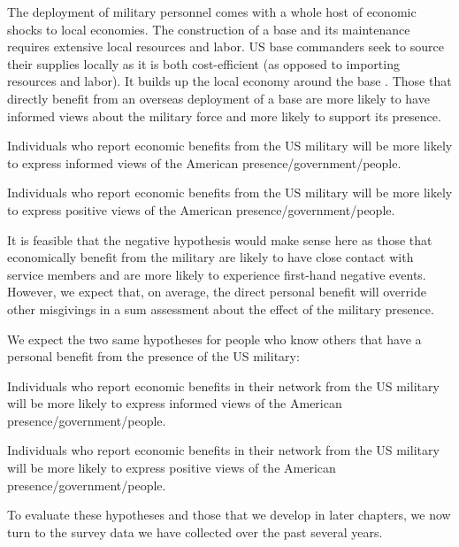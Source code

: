The deployment of military personnel comes with a whole host of economic shocks to local economies. The construction of a base and its maintenance requires extensive local resources and labor. US base commanders seek to source their supplies locally as it is both cost-efficient (as opposed to importing resources and labor). It builds up the local economy around the base \cite{rafthree20190719,kaserneone20190725}. Those that directly benefit from an overseas deployment of a base are more likely to have informed views about the military force and more likely to support its presence.

\begin{subhyp}
	
	\begin{hyp}
		Individuals who report economic benefits from the US military will be more likely to express informed views of the American presence/government/people. 
	\end{hyp}
	
	
	\begin{hyp}
		Individuals who report economic benefits from the US military will be more likely to express positive views of the American presence/government/people. 
	\end{hyp}
	
	
\end{subhyp}


It is feasible that the negative hypothesis would make sense here as those that economically benefit from the military are likely to have close contact with service members and are more likely to experience first-hand negative events. However, we expect that, on average, the direct personal benefit will override other misgivings in a sum assessment about the effect of the military presence.

We expect the two same hypotheses for people who know others that have a personal benefit from the presence of the US military:

\begin{subhyp}
	
	\begin{hyp}
		Individuals who report economic benefits in their network from the US military will be more likely to express informed views of the American presence/government/people. 
	\end{hyp}
	
	
	\begin{hyp}
		Individuals who report economic benefits in their network from the US military will be more likely to express positive views of the American presence/government/people. 
	\end{hyp}
	
	
\end{subhyp}

To evaluate these hypotheses and those that we develop in later chapters, we now turn to the survey data we have collected over the past several years. 